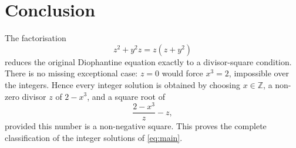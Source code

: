 \documentclass[11pt,a4paper]{amsart}
\theoremstyle{definition}
\newcommand{\Z}{\mathbb Z}
\begin{document}
\section{Conclusion}

The factorisation
\[
        z^2+y^2z=z(z+y^2)
\]
reduces the original Diophantine equation exactly to a divisor-square condition. There is no missing exceptional case: $z=0$ would force $x^3=2$, impossible over the integers. Hence every integer solution is obtained by choosing $x\in\Z$, a non-zero divisor $z$ of $2-x^3$, and a square root of
\[
        \frac{2-x^3}{z}-z,
\]
provided this number is a non-negative square. This proves the complete classification of the integer solutions of \eqref{eq:main}.
\end{document}
